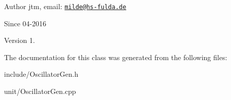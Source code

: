 \begin{DoxyAuthor}{Author}
jtm, email\-:  \href{mailto:milde@hs-fulda.de}{\tt milde@hs-\/fulda.\-de} 
\end{DoxyAuthor}
\begin{DoxySince}{Since}
04-\/2016 
\end{DoxySince}
\begin{DoxyVersion}{Version}
1. 
\end{DoxyVersion}


The documentation for this class was generated from the following files\-:\begin{DoxyCompactItemize}
\item 
include/Oscillator\-Gen.\-h\item 
unit/Oscillator\-Gen.\-cpp\end{DoxyCompactItemize}

